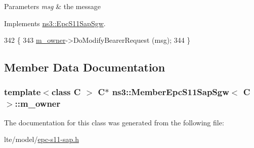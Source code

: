 \begin{DoxyParams}{Parameters}
{\em msg} & the message \\
\hline
\end{DoxyParams}


Implements \hyperlink{classns3_1_1EpcS11SapSgw_a76232b4e3dd041237affd3c36d499646}{ns3\+::\+Epc\+S11\+Sap\+Sgw}.


\begin{DoxyCode}
342 \{
343   \hyperlink{classns3_1_1MemberEpcS11SapSgw_a94f743030c4bc4d45a16d6cb0c02a363}{m\_owner}->DoModifyBearerRequest (msg);
344 \}
\end{DoxyCode}


\subsection{Member Data Documentation}
\subsubsection[{\texorpdfstring{m\+\_\+owner}{m_owner}}]{\setlength{\rightskip}{0pt plus 5cm}template$<$class C $>$ {\bf C}$\ast$ {\bf ns3\+::\+Member\+Epc\+S11\+Sap\+Sgw}$<$ {\bf C} $>$\+::m\+\_\+owner\hspace{0.3cm}{\ttfamily [private]}}\hypertarget{classns3_1_1MemberEpcS11SapSgw_a94f743030c4bc4d45a16d6cb0c02a363}{}\label{classns3_1_1MemberEpcS11SapSgw_a94f743030c4bc4d45a16d6cb0c02a363}


The documentation for this class was generated from the following file\+:\begin{DoxyCompactItemize}
\item 
lte/model/\hyperlink{epc-s11-sap_8h}{epc-\/s11-\/sap.\+h}\end{DoxyCompactItemize}
